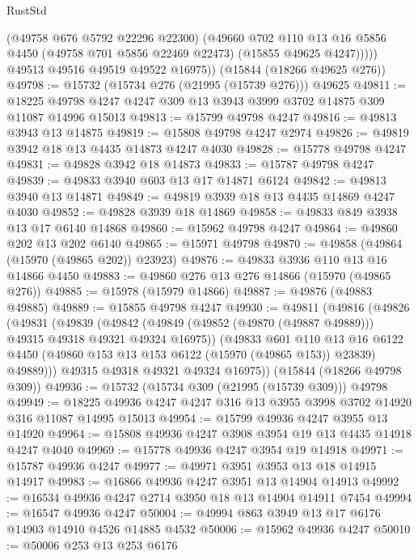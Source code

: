 \begin{lexlean}{RustStd}
\begin{coremodule}
              (@49758 @676 @5792 @22296 @22300)
              (@49660
                @702
                @110
                @13
                @16
                @5856
                @4450
                (@49758 @701 @5856 @22469 @22473)
                (@15855 @49625 @4247)))))
        @49513
        @49516
        @49519
        @49522
        @16975))
    (@15844 (@18266 @49625 @276))
@49798 := @15732 (@15734 @276 (@21995 (@15739 @276))) @49625
@49811 := @18225 @49798 @4247 @4247 @309 @13 @3943 @3999 @3702 @14875 @309 @11087 @14996 @15013
@49813 := @15799 @49798 @4247
@49816 := @49813 @3943 @13 @14875
@49819 := @15808 @49798 @4247 @2974
@49826 := @49819 @3942 @18 @13 @4435 @14873 @4247 @4030
@49828 := @15778 @49798 @4247
@49831 := @49828 @3942 @18 @14873
@49833 := @15787 @49798 @4247
@49839 := @49833 @3940 @603 @13 @17 @14871 @6124
@49842 := @49813 @3940 @13 @14871
@49849 := @49819 @3939 @18 @13 @4435 @14869 @4247 @4030
@49852 := @49828 @3939 @18 @14869
@49858 := @49833 @849 @3938 @13 @17 @6140 @14868
@49860 := @15962 @49798 @4247
@49864 := @49860 @202 @13 @202 @6140
@49865 := @15971 @49798
@49870 := @49858 (@49864 (@15970 (@49865 @202)) @23923)
@49876 := @49833 @3936 @110 @13 @16 @14866 @4450
@49883 := @49860 @276 @13 @276 @14866 (@15970 (@49865 @276))
@49885 := @15978 (@15979 @14866)
@49887 := @49876 (@49883 @49885)
@49889 := @15855 @49798 @4247
@49930 := @49811
    (@49816
      (@49826
        (@49831
          (@49839
            (@49842 (@49849 (@49852 (@49870 (@49887 @49889))) @49315 @49318 @49321 @49324 @16975))
            (@49833
              @601
              @110
              @13
              @16
              @6122
              @4450
              (@49860 @153 @13 @153 @6122 (@15970 (@49865 @153)) @23839)
              @49889)))
        @49315
        @49318
        @49321
        @49324
        @16975))
    (@15844 (@18266 @49798 @309))
@49936 := @15732 (@15734 @309 (@21995 (@15739 @309))) @49798
@49949 := @18225 @49936 @4247 @4247 @316 @13 @3955 @3998 @3702 @14920 @316 @11087 @14995 @15013
@49954 := @15799 @49936 @4247 @3955 @13 @14920
@49964 := @15808 @49936 @4247 @3908 @3954 @19 @13 @4435 @14918 @4247 @4040
@49969 := @15778 @49936 @4247 @3954 @19 @14918
@49971 := @15787 @49936 @4247
@49977 := @49971 @3951 @3953 @13 @18 @14915 @14917
@49983 := @16866 @49936 @4247 @3951 @13 @14904 @14913
@49992 := @16534 @49936 @4247 @2714 @3950 @18 @13 @14904 @14911 @7454
@49994 := @16547 @49936 @4247
@50004 := @49994 @863 @3949 @13 @17 @6176 @14903 @14910 @4526 @14885 @4532
@50006 := @15962 @49936 @4247
@50010 := @50006 @253 @13 @253 @6176

\end{coremodule}
\end{lexlean}
